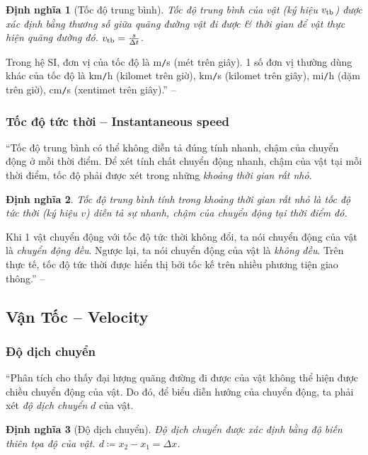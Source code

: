 \documentclass[oneside]{book}
\numberwithin{equation}{section}
\newtheorem{dinhnghia}{Định nghĩa}[section]
\begin{document}
\begin{dinhnghia}[Tốc độ trung bình]
	\emph{Tốc độ trung bình} của vật (ký hiệu $v_{\rm tb}$) được xác định bằng thương số giữa quãng đường vật đi được \& thời gian để vật thực hiện quãng đường đó. $v_{\rm tb} = \frac{s}{\Delta t}$.
\end{dinhnghia}
Trong hệ SI, đơn vị của tốc độ là m\texttt{/}s (mét trên giây). 1 số đơn vị thường dùng khác của tốc độ là km\texttt{/}h (kilomet trên giờ), km\texttt{/}s (kilomet trên giây), mi\texttt{/}h (dặm trên giờ), cm\texttt{/}s (xentimet trên giây).'' -- \cite[pp. 25]{SGK_Vat_Ly_10_Chan_Troi_Sang_Tao}

\subsubsection{Tốc độ tức thời -- Instantaneous speed}
``Tốc độ trung bình có thể không diễn tả đúng tính nhanh, chậm của chuyển động ở mỗi thời điểm. Để xét tính chất chuyển động nhanh, chậm của vật tại mỗi thời điểm, tốc độ phải được xét trong những \textit{khoảng thời gian rất nhỏ}.

\begin{dinhnghia}
	Tốc độ trung bình tính trong khoảng thời gian rất nhỏ là \emph{tốc độ tức thời} (ký hiệu $v$) diễn tả sự nhanh, chậm của chuyển động tại thời điểm đó.
\end{dinhnghia}
Khi 1 vật chuyển động với tốc độ tức thời không đổi, ta nói chuyển động của vật là \textit{chuyển động đều}. Ngược lại, ta nói chuyển động của vật là \textit{không đều}. Trên thực tế, tốc độ tức thời được hiển thị bởi tốc kế trên nhiều phương tiện giao thông.'' -- \cite[pp. 25]{SGK_Vat_Ly_10_Chan_Troi_Sang_Tao}

\subsection{Vận Tốc -- Velocity}

\subsubsection{Độ dịch chuyển}
``Phân tích cho thấy đại lượng quãng đường đi được của vật không thể hiện được chiều chuyển động của vật. Do đó, để biểu diễn hướng của chuyển động, ta phải xét \textit{độ dịch chuyển} $d$ của vật.

\begin{dinhnghia}[Độ dịch chuyển]
	\emph{Độ dịch chuyển} được xác định bằng độ biến thiên tọa độ của vật. $d\coloneqq x_2 - x_1 = \Delta x$.
\end{dinhnghia}
\end{document}
